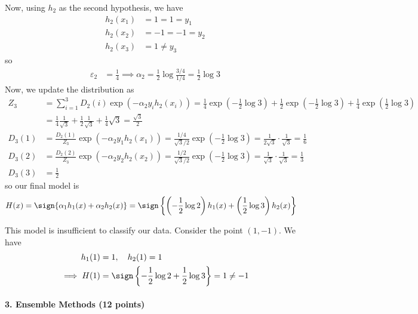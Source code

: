 \documentclass{article}
\begin{document}
\begin{soln}
	Now, using $h_2$ as the second hypothesis, we have
	\begin{align*}
		h_2(x_1) &= 1 = 1 = y_1 \\
		h_2(x_2) &= -1 =-1 = y_2 \\
		h_2(x_3) &= 1 \neq y_3
	\end{align*}
	so
	\begin{align*}
		\varepsilon_2 &= \frac{1}{4}  \implies \alpha_2 = \frac{1}{2} \log \frac{3/4}{1/4} = \frac{1}{2}\log 3
	\end{align*}
	Now, we update the distribution as
	\begin{align*}
		Z_3 &= \sum_{i=1}^{3} D_2(i)\exp\left( -\alpha_2 y_i h_2(x_i) \right) = \frac{1}{4}\exp\left( -\frac{1}{2}\log 3 \right) + \frac{1}{2}\exp\left( -\frac{1}{2}\log 3 \right) + \frac{1}{4}\exp\left( \frac{1}{2}\log 3 \right) \\
		&= \frac{1}{4} \frac{1}{\sqrt{3}} + \frac{1}{2}\frac{1}{\sqrt{3}} + \frac{1}{4}\sqrt{3}= \frac{\sqrt{3}}{2} \\
		D_3(1) &= \frac{D_2(1)}{Z_3}\exp\left( -\alpha_2 y_1 h_2(x_1) \right) = \frac{1/4}{\sqrt{3}/2}\exp\left(- \frac{1}{2}\log 3 \right) = \frac{1}{2\sqrt{3}}\cdot\frac{1}{\sqrt{3}} = \frac{1}{6} \\
		D_3(2) &= \frac{D_2(2)}{Z_3}\exp\left( -\alpha_2 y_2h_2(x_2) \right) = \frac{1/2}{\sqrt{3}/2}\exp\left( -\frac{1}{2}\log 3 \right) = \frac{1}{\sqrt{3}}\cdot \frac{1}{\sqrt{3}} = \frac{1}{3} \\
		D_3(3) &= \frac{1}{2}
	\end{align*}
	so our final model is
	\begin{align*}
		H(x) &= \sign\{\alpha_1h_1(x) + \alpha_2h_2(x)\} = \sign\left\{\left( -\frac{1}{2}\log 2 \right) h_1(x) + \left( \frac{1}{2}\log 3 \right) h_2(x) \right\}
	\end{align*}

	This model is insufficient to classify our data. Consider the point $(1, -1).$ We have
	\begin{align*}
		h_1(1) &= 1, \quad h_2(1) = 1 \\
		\implies H(1) &= \sign\left\{ -\frac{1}{2}\log 2 + \frac{1}{2}\log 3 \right\} = 1 \neq -1
	\end{align*}
\end{soln}

\newpage
\paragraph{3. Ensemble Methods (12 points)}
\end{document}
